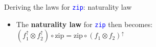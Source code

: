\documentclass[english]{beamer}
\begin{document}
\begin{frame}{Deriving the laws for \texttt{\textcolor{blue}{\footnotesize{}zip}}:
naturality law}
\begin{itemize}
{\begin{align*}
\left(f_{1}^{\uparrow}\otimes f_{2}^{\uparrow}\right)\circ\text{fmap2}\,g & =\text{fmap2}\left(\left(f_{1}\otimes f_{2}\right)^{\uparrow}\circ g\right)\\
\left(f_{1}^{\uparrow}\otimes f_{2}^{\uparrow}\right)\circ\text{zip}\circ g^{\uparrow} & =\text{zip}\circ\left(f_{1}\otimes f_{2}\right)^{\uparrow}\circ g^{\uparrow}
\end{align*}
}{\footnotesize \par}
\item \vspace{-0.2cm}The \textbf{naturality law} for \texttt{\textcolor{blue}{\footnotesize{}zip}}
then becomes: {\footnotesize{}$\left(f_{1}^{\uparrow}\otimes f_{2}^{\uparrow}\right)\circ\text{zip}=\text{zip}\circ\left(f_{1}\otimes f_{2}\right)^{\uparrow}$} 
\end{itemize}
\end{frame}
\end{document}
